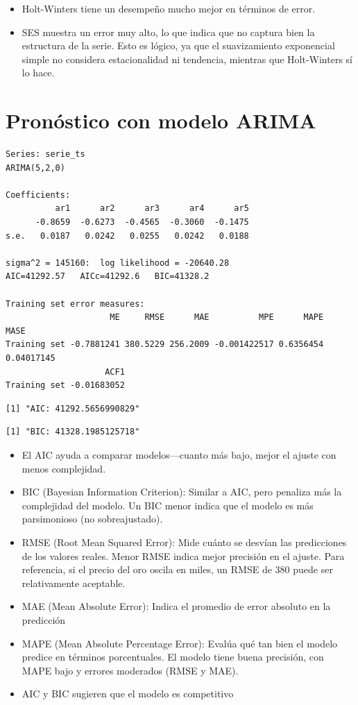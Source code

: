 \documentclass[
]{book}
\providecommand{\tightlist}{%
  \setlength{\itemsep}{0pt}\setlength{\parskip}{0pt}}
\begin{document}
\begin{itemize}
\tightlist
\item
  Holt-Winters tiene un desempeño mucho mejor en términos de error.
\item
  SES muestra un error muy alto, lo que indica que no captura bien la estructura de la serie. Esto es lógico, ya que el suavizamiento exponencial simple no considera estacionalidad ni tendencia, mientras que Holt-Winters sí lo hace.
\end{itemize}

\chapter{Pronóstico con modelo ARIMA}\label{pronuxf3stico-con-modelo-arima}

\begin{verbatim}
Series: serie_ts 
ARIMA(5,2,0) 

Coefficients:
          ar1      ar2      ar3      ar4      ar5
      -0.8659  -0.6273  -0.4565  -0.3060  -0.1475
s.e.   0.0187   0.0242   0.0255   0.0242   0.0188

sigma^2 = 145160:  log likelihood = -20640.28
AIC=41292.57   AICc=41292.6   BIC=41328.2

Training set error measures:
                     ME     RMSE      MAE          MPE      MAPE       MASE
Training set -0.7881241 380.5229 256.2009 -0.001422517 0.6356454 0.04017145
                    ACF1
Training set -0.01683052
\end{verbatim}

\begin{verbatim}
[1] "AIC: 41292.5656990829"
\end{verbatim}

\begin{verbatim}
[1] "BIC: 41328.1985125718"
\end{verbatim}

\begin{itemize}
\tightlist
\item
  El AIC ayuda a comparar modelos---cuanto más bajo, mejor el ajuste con menos complejidad.
\item
  BIC (Bayesian Information Criterion): Similar a AIC, pero penaliza más la complejidad del modelo. Un BIC menor indica que el modelo es más parsimonioso (no sobreajustado).
\item
  RMSE (Root Mean Squared Error): Mide cuánto se desvían las predicciones de los valores reales. Menor RMSE indica mejor precisión en el ajuste. Para referencia, si el precio del oro oscila en miles, un RMSE de 380 puede ser relativamente aceptable.
\item
  MAE (Mean Absolute Error): Indica el promedio de error absoluto en la predicción
\item
  MAPE (Mean Absolute Percentage Error): Evalúa qué tan bien el modelo predice en términos porcentuales. El modelo tiene buena precisión, con MAPE bajo y errores moderados (RMSE y MAE).
\item
  AIC y BIC sugieren que el modelo es competitivo
\end{itemize}
\end{document}
